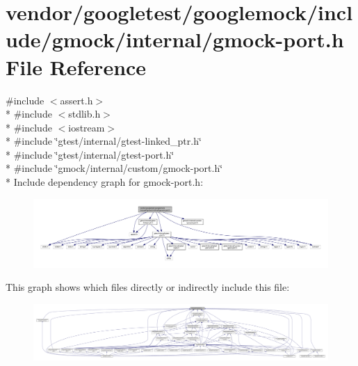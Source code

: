 \hypertarget{gmock-port_8h}{}\section{vendor/googletest/googlemock/include/gmock/internal/gmock-\/port.h File Reference}
\label{gmock-port_8h}
{\ttfamily \#include $<$assert.\+h$>$}\\*
{\ttfamily \#include $<$stdlib.\+h$>$}\\*
{\ttfamily \#include $<$iostream$>$}\\*
{\ttfamily \#include \char`\"{}gtest/internal/gtest-\/linked\+\_\+ptr.\+h\char`\"{}}\\*
{\ttfamily \#include \char`\"{}gtest/internal/gtest-\/port.\+h\char`\"{}}\\*
{\ttfamily \#include \char`\"{}gmock/internal/custom/gmock-\/port.\+h\char`\"{}}\\*
Include dependency graph for gmock-\/port.h\+:
\nopagebreak
\begin{figure}[H]
\begin{center}
\leavevmode
\includegraphics[width=350pt]{gmock-port_8h__incl}
\end{center}
\end{figure}
This graph shows which files directly or indirectly include this file\+:
\nopagebreak
\begin{figure}[H]
\begin{center}
\leavevmode
\includegraphics[width=350pt]{gmock-port_8h__dep__incl}
\end{center}
\end{figure}
